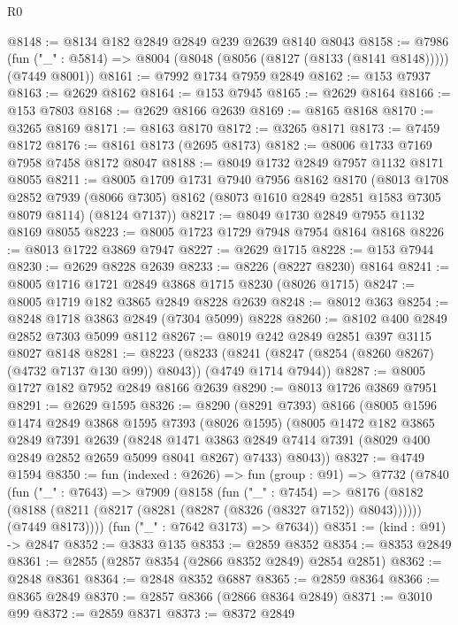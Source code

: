 \begin{lexlean}{R0}
\begin{coremodule}
@8148 := @8134 @182 @2849 @2849 @239 @2639 @8140 @8043
@8158 := @7986
    (fun ("_" : @5814) => @8004 (@8048 (@8056 (@8127 (@8133 (@8141 @8148))))) (@7449 @8001))
@8161 := @7992 @1734 @7959 @2849
@8162 := @153 @7937
@8163 := @2629 @8162
@8164 := @153 @7945
@8165 := @2629 @8164
@8166 := @153 @7803
@8168 := @2629 @8166 @2639
@8169 := @8165 @8168
@8170 := @3265 @8169
@8171 := @8163 @8170
@8172 := @3265 @8171
@8173 := @7459 @8172
@8176 := @8161 @8173 (@2695 @8173)
@8182 := @8006 @1733 @7169 @7958 @7458 @8172 @8047
@8188 := @8049 @1732 @2849 @7957 @1132 @8171 @8055
@8211 := @8005
    @1709
    @1731
    @7940
    @7956
    @8162
    @8170
    (@8013
      @1708
      @2852
      @7939
      (@8066 @7305)
      @8162
      (@8073 @1610 @2849 @2851 @1583 @7305 @8079 @8114)
      (@8124 @7137))
@8217 := @8049 @1730 @2849 @7955 @1132 @8169 @8055
@8223 := @8005 @1723 @1729 @7948 @7954 @8164 @8168
@8226 := @8013 @1722 @3869 @7947
@8227 := @2629 @1715
@8228 := @153 @7944
@8230 := @2629 @8228 @2639
@8233 := @8226 (@8227 @8230) @8164
@8241 := @8005 @1716 @1721 @2849 @3868 @1715 @8230 (@8026 @1715)
@8247 := @8005 @1719 @182 @3865 @2849 @8228 @2639
@8248 := @8012 @363
@8254 := @8248 @1718 @3863 @2849 (@7304 @5099) @8228
@8260 := @8102 @400 @2849 @2852 @7303 @5099 @8112
@8267 := @8019 @242 @2849 @2851 @397 @3115 @8027 @8148
@8281 := @8223
    (@8233 (@8241 (@8247 (@8254 (@8260 @8267) (@4732 @7137 @130 @99)) @8043)) (@4749 @1714 @7944))
@8287 := @8005 @1727 @182 @7952 @2849 @8166 @2639
@8290 := @8013 @1726 @3869 @7951
@8291 := @2629 @1595
@8326 := @8290
    (@8291 @7393)
    @8166
    (@8005
      @1596
      @1474
      @2849
      @3868
      @1595
      @7393
      (@8026 @1595)
      (@8005
        @1472
        @182
        @3865
        @2849
        @7391
        @2639
        (@8248 @1471 @3863 @2849 @7414 @7391 (@8029 @400 @2849 @2852 @2659 @5099 @8041 @8267) @7433)
        @8043))
@8327 := @4749 @1594
@8350 := fun (indexed : @2626) =>
  fun (group : @91) =>
  @7732
    (@7840
      (fun ("_" : @7643) =>
      @7909
        (@8158
          (fun ("_" : @7454) =>
          @8176
            (@8182 (@8188 (@8211 (@8217 (@8281 (@8287 (@8326 (@8327 @7152)) @8043))))))
            (@7449 @8173))))
      (fun ("_" : @7642 @3173) => @7634))
@8351 := (kind : @91) -> @2847
@8352 := @3833 @135
@8353 := @2859 @8352
@8354 := @8353 @2849
@8361 := @2855 (@2857 @8354 (@2866 @8352 @2849) @2854 @2851)
@8362 := @2848 @8361
@8364 := @2848 @8352 @6887
@8365 := @2859 @8364
@8366 := @8365 @2849
@8370 := @2857 @8366 (@2866 @8364 @2849)
@8371 := @3010 @99
@8372 := @2859 @8371
@8373 := @8372 @2849

\end{coremodule}
\end{lexlean}
